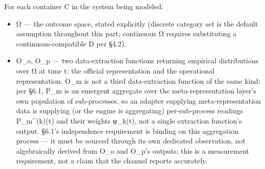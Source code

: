 \documentclass[
]{article}
\begin{document}
For each container C in the system being modeled:

\begin{itemize}
\item
  Ω --- the outcome space, stated explicitly (discrete category set is
  the default assumption throughout this part; continuous Ω requires
  substituting a continuous-compatible D per §4.2).
\item
  O\_o, O\_p --- two data-extraction functions returning empirical
  distributions over Ω at time t: the official representation and the
  operational representation. O\_m is not a third data-extraction
  function of the same kind: per §6.1, P\_m is an emergent aggregate
  over the meta-representation layer's own population of sub-processes,
  so an adapter supplying meta-representation data is supplying (or the
  engine is aggregating) per-sub-process readings P\_m\^{}(k)(t) and
  their weights φ\_k(t), not a single extraction function's output.
  §6.1's independence requirement is binding on this aggregation process
  --- it must be sourced through its own dedicated observation, not
  algebraically derived from O\_o and O\_p's outputs; this is a
  measurement requirement, not a claim that the channel reports
  accurately.
\end{itemize}
\end{document}
